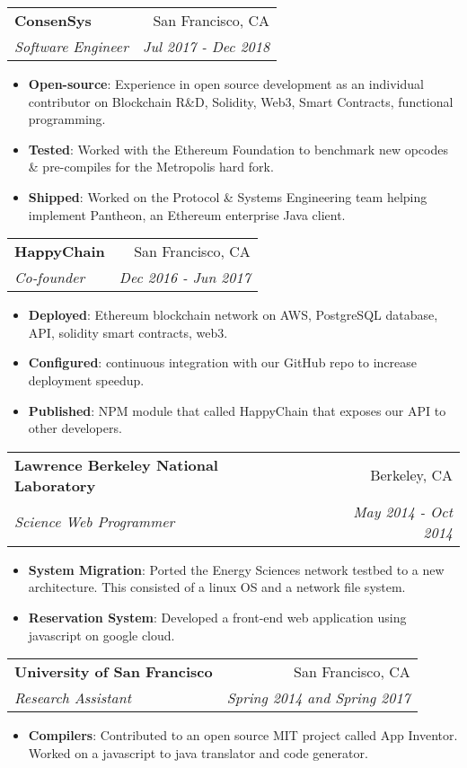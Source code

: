 \documentclass[letterpaper,11pt]{article}
\makeatletter
\newcommand{\resumeItem}[2]{
  \item\small{
    \textbf{#1}{: #2 \vspace{-2pt}}
  }
}
\newcommand{\resumeSubheading}[4]{
  \vspace{-1pt}\item
    \begin{tabular*}{0.97\textwidth}[t]{l@{\extracolsep{\fill}}r}
      \textbf{#1} & #2 \\
      \textit{\small#3} & \textit{\small #4} \\
    \end{tabular*}\vspace{-5pt}
}
\newcommand{\resumeItemListStart}{\begin{itemize}}
\newcommand{\resumeItemListEnd}{\end{itemize}\vspace{-5pt}}
\makeatother
\begin{document}

    \resumeSubheading
      {ConsenSys}{San Francisco, CA}
      {Software Engineer}{Jul 2017 - Dec 2018}
      \resumeItemListStart
        \resumeItem{Open-source}
          {Experience in open source development as an individual contributor on Blockchain R\&D, Solidity, Web3, Smart Contracts, functional programming.}
        \resumeItem{Tested}
          {Worked with the Ethereum Foundation to benchmark new opcodes \& pre-compiles for the Metropolis hard fork.}
        \resumeItem{Shipped}
          {Worked on the Protocol \& Systems Engineering team helping implement Pantheon, an Ethereum enterprise Java client.}
      \resumeItemListEnd

    \resumeSubheading
      {HappyChain}{San Francisco, CA}
      {Co-founder}{Dec 2016 - Jun 2017}
      \resumeItemListStart
        \resumeItem{Deployed}
          {Ethereum blockchain network on AWS, PostgreSQL database, API, solidity smart contracts, web3.}
        \resumeItem{Configured}
          {continuous integration with our GitHub repo to increase deployment speedup.}
        \resumeItem{Published}
          {NPM module that called HappyChain that exposes our API to other developers.}
       \resumeItemListEnd

    \resumeSubheading
      {Lawrence Berkeley National Laboratory}{Berkeley, CA}
      {Science Web Programmer}{May 2014 - Oct 2014}
      \resumeItemListStart
        \resumeItem{System Migration}
          {Ported the Energy Sciences network testbed to a new architecture. This consisted of a linux OS and a network file system.}
        \resumeItem{Reservation System}
          {Developed a front-end web application using javascript on google cloud.}
       \resumeItemListEnd

    \resumeSubheading
      {University of San Francisco}{San Francisco, CA}
      {Research Assistant}{Spring 2014 and Spring 2017}
      \resumeItemListStart
        \resumeItem{Compilers}
          {Contributed to an open source MIT project called App Inventor. Worked on a javascript to java translator and code generator.}
      \resumeItemListEnd
\end{document}
